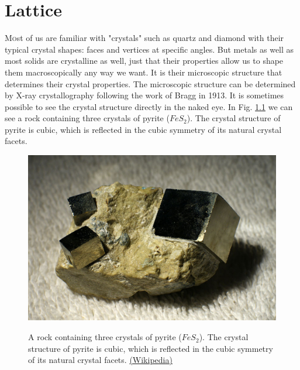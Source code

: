 \documentclass{Textbook}
\begin{document}
\chapter{Lattice}
\lettrine[lines=3,slope=6pt,nindent=6pt]{\initfamily M}{o}st of us are familiar with "crystals" such as quartz and diamond with their typical crystal shapes: faces and vertices at specific angles. But metals as well as most solids are crystalline as well, just that their properties allow us to shape them macroscopically any way we want. It is their microscopic structure that determines their crystal properties. The microscopic structure can be determined by X-ray crystallography following the work of Bragg in 1913.\nl
It is sometimes possible to see the crystal structure directly in the naked eye. In Fig. \ref{fig:pyrite} we can see a rock containing three crystals of pyrite ($FeS_2$). The crystal structure of pyrite is cubic, which is reflected in the cubic symmetry of its natural crystal facets.
\begin{figure}[!ht] 
  \centering
  \includegraphics[width=14cm]{pyrite_cubesj.jpg}\\
  \caption{A rock containing three crystals of pyrite ($FeS_2$). The crystal structure of pyrite is cubic, which is reflected in the cubic symmetry of its natural crystal facets. \href{http://en.wikipedia.org/wiki/Pyrite}{(Wikipedia)}}
  \label{fig:pyrite}
\end{figure}
\end{document}
